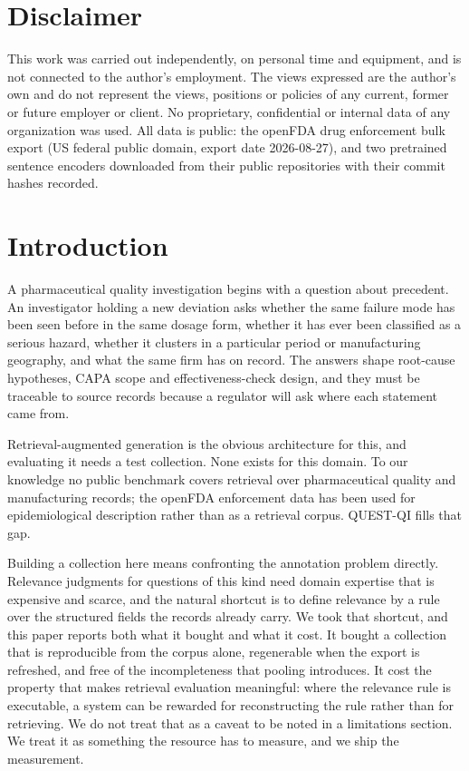 \documentclass[runningheads]{llncs}
\begin{document}
\section*{Disclaimer}
This work was carried out independently, on personal time and equipment, and is not connected to the author's employment. The views expressed are the author's own and do not represent the views, positions or policies of any current, former or future employer or client. No proprietary, confidential or internal data of any organization was used. All data is public: the openFDA drug enforcement bulk export (US federal public domain, export date 2026-08-27), and two pretrained sentence encoders downloaded from their public repositories with their commit hashes recorded.


\section{Introduction}
A pharmaceutical quality investigation begins with a question about precedent. An investigator holding a new deviation asks whether the same failure mode has been seen before in the same dosage form, whether it has ever been classified as a serious hazard, whether it clusters in a particular period or manufacturing geography, and what the same firm has on record. The answers shape root-cause hypotheses, CAPA scope and effectiveness-check design, and they must be traceable to source records because a regulator will ask where each statement came from.

Retrieval-augmented generation \cite{lewis2020rag} is the obvious architecture for this, and evaluating it needs a test collection. None exists for this domain. To our knowledge no public benchmark covers retrieval over pharmaceutical quality and manufacturing records; the openFDA enforcement data \cite{openfda_enforcement} has been used for epidemiological description rather than as a retrieval corpus. QUEST-QI fills that gap.

Building a collection here means confronting the annotation problem directly. Relevance judgments for questions of this kind need domain expertise that is expensive and scarce, and the natural shortcut is to define relevance by a rule over the structured fields the records already carry. We took that shortcut, and this paper reports both what it bought and what it cost. It bought a collection that is reproducible from the corpus alone, regenerable when the export is refreshed, and free of the incompleteness that pooling introduces. It cost the property that makes retrieval evaluation meaningful: where the relevance rule is executable, a system can be rewarded for reconstructing the rule rather than for retrieving. We do not treat that as a caveat to be noted in a limitations section. We treat it as something the resource has to measure, and we ship the measurement.
\end{document}
